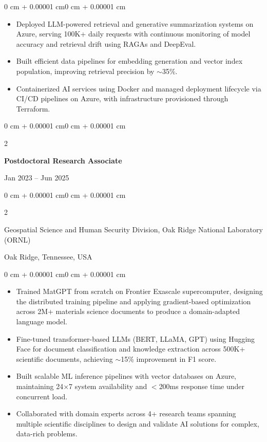 \documentclass[10pt, letterpaper]{article}
\newenvironment{highlights}{
    \begin{itemize}[topsep=0.10 cm, parsep=0.10 cm, partopsep=0pt, itemsep=0pt, leftmargin=0 cm + 10pt]
}{\end{itemize}}
\newenvironment{onecolentry}{
    \begin{adjustwidth}{0 cm + 0.00001 cm}{0 cm + 0.00001 cm}
}{\end{adjustwidth}}
\newenvironment{twocolentry}[2][]{
    \onecolentry
    \def\secondColumn{#2}
    \setcolumnwidth{\fill, 4.5 cm}
    \begin{paracol}{2}
}{
    \switchcolumn \raggedleft \secondColumn
    \end{paracol}
    \endonecolentry
}
\begin{document}
    \begin{onecolentry}
        \begin{highlights}
            \item Deployed LLM-powered retrieval and generative summarization systems on Azure, serving 100K+ daily requests with continuous monitoring of model accuracy and retrieval drift using RAGAs and DeepEval.
            \item Built efficient data pipelines for embedding generation and vector index population, improving retrieval precision by $\sim$35\%.
            \item Containerized AI services using Docker and managed deployment lifecycle via CI/CD pipelines on Azure, with infrastructure provisioned through Terraform.
        \end{highlights}
    \end{onecolentry}

\vspace{1mm}

    \begin{twocolentry}{Jan 2023 -- Jun 2025}
        \textbf{Postdoctoral Research Associate}
    \end{twocolentry}
    \begin{twocolentry}{Oak Ridge, Tennessee, USA}
        Geospatial Science and Human Security Division, Oak Ridge National Laboratory (ORNL)
    \end{twocolentry}
    \vspace{0.10 cm}
    \begin{onecolentry}
        \begin{highlights}
            \item Trained MatGPT from scratch on Frontier Exascale supercomputer, designing the distributed training pipeline and applying gradient-based optimization across 2M+ materials science documents to produce a domain-adapted language model.
            \item Fine-tuned transformer-based LLMs (BERT, LLaMA, GPT) using Hugging Face for document classification and knowledge extraction across 500K+ scientific documents, achieving $\sim$15\% improvement in F1 score.
            \item Built scalable ML inference pipelines with vector databases on Azure, maintaining 24×7 system availability and $<$200ms response time under concurrent load.
            \item Collaborated with domain experts across 4+ research teams spanning multiple scientific disciplines to design and validate AI solutions for complex, data-rich problems.
        \end{highlights}
    \end{onecolentry}
\end{document}
